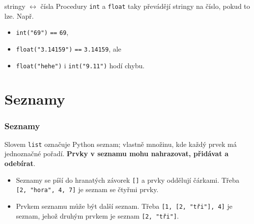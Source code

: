 \documentclass[aspectratio=169,11pt]{beamer}
\begin{document}
\begin{frame}{stringy $\leftrightarrow$ čísla}
 Procedury \texttt{int} a \texttt{float} taky převádějí stringy na číslo, pokud
 to lze. Např.
 \begin{itemize}
  \item<1-> \texttt{int("69")} \texttt{==} \texttt{69},
  \item<2-> \texttt{float("3.14159")} \texttt{==} \texttt{3.14159}, ale
  \item<3-> \texttt{float("hehe")} i \texttt{int("9.11")} hodí chybu.
 \end{itemize}
\end{frame}

\section[Seznamy]{Seznamy}

\begin{frame}[plain]
 \sectionpage
\end{frame}

\begin{frame}
 \frametitle{Seznamy}
 \begin{tcolorbox}[title=Datový tip \texttt{list}]
  Slovem \texttt{\alert{list}} označuje Python seznam; vlastně množinu, kde
  každý prvek má jednoznačné pořadí. \textbf{Prvky v seznamu mohu nahrazovat,
  přidávat a odebírat}.
 \end{tcolorbox}
 \pause
 \begin{itemize}
  \item<2-> Seznamy se píší do \alert{hranatých závorek} \texttt{[]} a prvky
   oddělují čárkami. Třeba \texttt{[2,~"hora", 4, 7]} je seznam se čtyřmi
   prvky.
  \item<3-> Prvkem seznamu může být další seznam. Třeba  \texttt{[1, [2, "tři"],
   4]} je seznam, jehož druhým prvkem je seznam \texttt{[2, "tři"]}.
 \end{itemize}
\end{frame}
\end{document}

